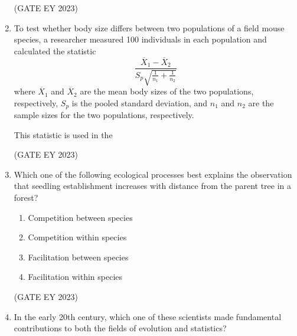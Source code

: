 \documentclass[journal,12pt,onecolumn]{IEEEtran}
\theoremstyle{remark}
\begin{document}
\begin{enumerate}
\hfill{(GATE EY 2023)}
 \item To test whether body size differs between two populations of a field mouse
species, a researcher measured 100 individuals in each population and calculated
the statistic
\[
\frac{\overline{X}_1 - \overline{X}_2}{S_p \sqrt{\tfrac{1}{n_1} + \tfrac{1}{n_2}}}
\]
where $\overline{X}_1$ and $\overline{X}_2$ are the mean body sizes of the two populations,
respectively, $S_p$ is the pooled standard deviation, and $n_1$ and $n_2$ are the sample sizes
for the two populations, respectively.

This statistic is used in the

\begin{enumerate}
\end{enumerate}
\hfill{(GATE EY 2023)}


 \item Which one of the following ecological processes best explains the observation that
seedling establishment increases with distance from the parent tree in a forest?

\begin{enumerate}

\item Competition between species
\item Competition within species

\item Facilitation between species

\item Facilitation within species


\end{enumerate}

\hfill{(GATE EY 2023)}

 \item In the early 20th century, which one of these scientists made fundamental
contributions to both the fields of evolution and statistics?
\begin{enumerate}
\end{enumerate}
\end{enumerate}
\end{document}
